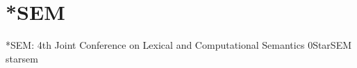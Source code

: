 \chapter[Colocated conference: *SEM: Thursday--Friday, June 4--5]{*SEM}
\thispagestyle{emptyheader}



\clearpage
\begin{wsschedule}
  {*SEM: 4th Joint Conference on Lexical and Computational Semantics}
  {0}{StarSEM}
  {starsem}
  {\StarSEMLoc}

  

\end{wsschedule}
